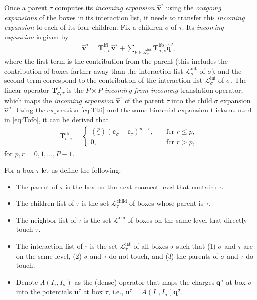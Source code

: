 \documentclass[final,onefignum,onetabnum]{siamart220329}
\newcommand{\bol}{\boldsymbol}
\newcommand{\Lcal}{\mathcal{L}}
\newcommand{\Tbf}{\mathbf{T}}
\begin{document}
Once a parent $\tau$ computes its \textit{incoming expansion} $\bol{\hat{v}}^{\tau}$ using the \textit{outgoing expansions} of the boxes in its interaction list, it needs to transfer this \textit{incoming expansion} to each of its four children. Fix a children $\sigma$ of $\tau$. Its \textit{incoming expansion} is given by
\begin{align}
	\bol{\hat{v}}^{\sigma} = \Tbf_{\tau,\sigma}^\text{ifi}\bol{\hat{v}}^{\tau} + \sum_{\nu\in\Lcal_\sigma^\text{int}} \Tbf_{\sigma,\nu}^\text{ifo}\bol{\hat{q}}^{\nu},
\end{align}
where the first term is the contribution from the parent (this includes the contribution of boxes farther away than the interaction list $\Lcal_\sigma^\text{int}$ of $\sigma$), and the second term correspond to the contribution of the interaction list $\Lcal_\sigma^\text{int}$ of $\sigma$. The linear operator $\Tbf_{\sigma,\tau}^\text{ifi}$ is the $P\times P$ \textit{incoming-from-incoming} translation operator, which maps the \textit{incoming expansion} $\bol{\hat{v}}^{\tau}$ of the parent $\tau$ into the child $\sigma$ expansion $\bol{\hat{v}}^{\sigma}$. Using the expression \cref{eq:Ttfi} and the same binomial expansion tricks as used in \cref{eq:Tofo}, it can be derived that
\begin{align}
	\Tbf_{\sigma,\tau}^\text{ifi} = \begin{cases}
		\binom{p}{r}(\bol c_\sigma-\bol c_\tau)^{p-r},\quad&\text{for }r\leq p,\\
		0, &\text{for }r> p,
	\end{cases}
\end{align}
for $p,r=0,1,\dots,P-1$.

For a box $\tau$ let us define the following:
\begin{itemize}
	\item The parent of $\tau$ is the box on the next coarsest level that contains $\tau$.
	\item The children list of $\tau$ is the set $\Lcal_\tau^\text{child}$ of boxes whose parent is $\tau$.
	\item The neighbor list of $\tau$ is the set $\Lcal_\tau^\text{nei}$ of boxes on the same level that directly touch $\tau$.
	\item The interaction list of $\tau$ is the set $\Lcal_\tau^\text{int}$ of all boxes $\sigma$ such that (1) $\sigma$ and $\tau$ are on the same level, (2) $\sigma$ and $\tau$ do not touch, and (3) the parents of $\sigma$ and $\tau$ do touch.
	\item Denote $A(I_\tau,I_\sigma)$ as the (dense) operator that maps the charges $\bol q^\sigma$ at box $\sigma$ into the potentials $\bol u^\tau$ at box $\tau$, i.e., $\bol u^\tau=A(I_\tau,I_\sigma)\bol q^\sigma$.
\end{itemize}
\end{document}
